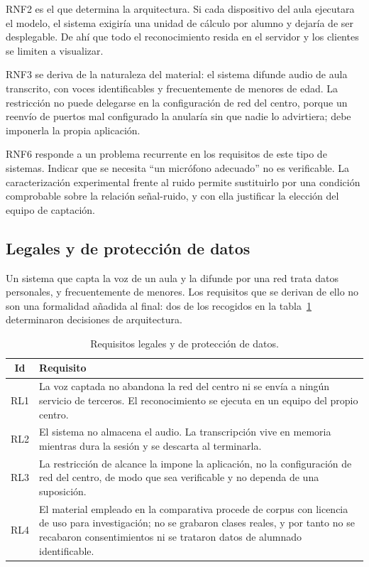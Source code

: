 RNF2 es el que determina la arquitectura. Si cada dispositivo del aula ejecutara el modelo,
el sistema exigiría una unidad de cálculo por alumno y dejaría de ser desplegable. De ahí
que todo el reconocimiento resida en el servidor y los clientes se limiten a visualizar.

RNF3 se deriva de la naturaleza del material: el sistema difunde audio de aula transcrito,
con voces identificables y frecuentemente de menores de edad. La restricción no puede
delegarse en la configuración de red del centro, porque un reenvío de puertos mal
configurado la anularía sin que nadie lo advirtiera; debe imponerla la propia aplicación.

RNF6 responde a un problema recurrente en los requisitos de este tipo de sistemas. Indicar
que se necesita ``un micrófono adecuado'' no es verificable. La caracterización
experimental frente al ruido permite sustituirlo por una condición comprobable sobre la
relación señal-ruido, y con ella justificar la elección del equipo de captación.

\subsection{Legales y de protección de datos}
\label{sec:requisitos-legales}

Un sistema que capta la voz de un aula y la difunde por una red trata datos personales, y
frecuentemente de menores. Los requisitos que se derivan de ello no son una formalidad
añadida al final: dos de los recogidos en la tabla~\ref{tab:rl} determinaron decisiones
de arquitectura.

\begin{table}[h]
\centering
\small
\begin{tabular}{|c|p{11cm}|}
\hline
\textbf{Id} & \textbf{Requisito} \\
\hline
RL1 & La voz captada no abandona la red del centro ni se envía a ningún servicio de
      terceros. El reconocimiento se ejecuta en un equipo del propio centro. \\
\hline
RL2 & El sistema no almacena el audio. La transcripción vive en memoria mientras dura la
      sesión y se descarta al terminarla. \\
\hline
RL3 & La restricción de alcance la impone la aplicación, no la configuración de red del
      centro, de modo que sea verificable y no dependa de una suposición. \\
\hline
RL4 & El material empleado en la comparativa procede de corpus con licencia de uso para
      investigación; no se grabaron clases reales, y por tanto no se recabaron
      consentimientos ni se trataron datos de alumnado identificable. \\
\hline
\end{tabular}
\caption{Requisitos legales y de protección de datos.}
\label{tab:rl}
\end{table}

